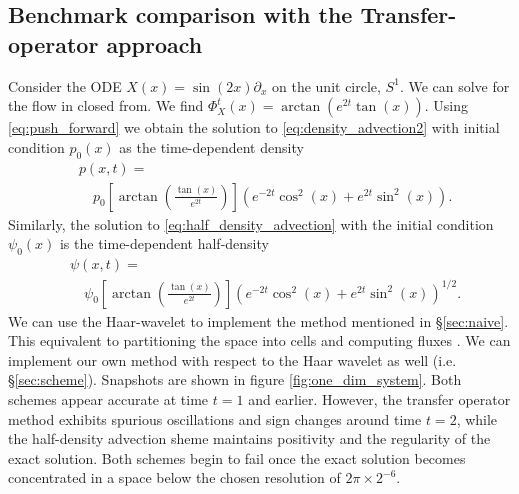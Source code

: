 \documentclass[letterpaper, 12 pt]{amsart}
\begin{document}
\subsection{Benchmark comparison with the Transfer-operator approach}
Consider the ODE $X(x) = \sin(2x) \partial_x$ on the unit circle, $S^1$.
We can solve for the flow in closed from.  We find
$\Phi_X^t(x) = \arctan( e^{2t} \tan(x) )$.
Using \eqref{eq:push_forward}
we obtain the solution to \eqref{eq:density_advection2} with initial condition $p_0(x)$ as the time-dependent density
\begin{align*}
  &p(x,t) = \\
  &\quad p_0\left[ \arctan \left( \frac{ \tan(x)}{e^{2t}} \right)\right]
  \left( e^{-2t} \cos^2(x) + e^{2t} \sin^2(x) \right).
\end{align*}
Similarly, the solution to \eqref{eq:half_density_advection} with the initial condition $\psi_0(x)$ is the time-dependent half-density
\begin{align*}
  &\psi(x,t) = \\
  &\quad \psi_0\left[\arctan\left( \frac{ \tan(x)}{e^{2t}} \right) \right]
  \left( e^{-2t} \cos^2(x) + e^{2t} \sin^2(x) \right)^{1/2}. 
\end{align*}
We can use the Haar-wavelet to implement the method mentioned in \S \ref{sec:naive}.  This equivalent to partitioning the space into cells and computing fluxes \cite{FroylandJungeKoltai2013}.  We can implement our own method with respect to the Haar wavelet as well (i.e. \S \ref{sec:scheme}).  Snapshots are shown in figure \ref{fig:one_dim_system}.
Both schemes appear accurate at time $t=1$ and earlier.
However, the transfer operator method exhibits spurious oscillations and sign changes around time $t=2$,
 while the half-density advection sheme maintains positivity and the regularity of the exact solution.
Both schemes begin to fail once the exact solution becomes concentrated in a space below the chosen resolution of $2\pi \times 2^{-6}$.
\end{document}
